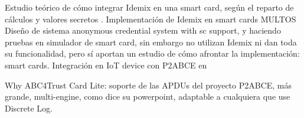 \hfil




Estudio teórico de cómo integrar Idemix en una smart card, según el reparto de cálculos y valores secretos \citep{luuk}.
Implementación de Idemix en smart cards MULTOS \citep{vullers2013efficient}
\citep{sucasas} Diseño de sistema anonymous credential system with sc support, y haciendo pruebas en simulador de smart card, sin embargo no utilizan Idemix ni dan toda su funcionalidad, pero sí aportan un estudio de cómo afrontar la implementación: smart cards.
Integración en IoT device con P2ABCE en \citep{vanet}





Why ABC4Trust Card Lite: soporte de las APDUs del proyecto P2ABCE, más grande, multi-engine, como dice su powerpoint, adaptable a cualquiera que use Discrete Log.